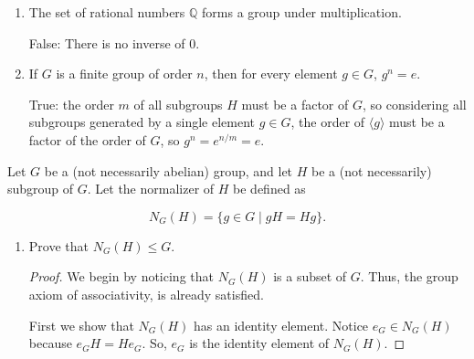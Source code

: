\documentclass{article}
\begin{document}
\begin{enumerate}
{\begin{enumerate}
{                True: we know this to be true because for every \(g' \in G\), 
                \(g * g^{-1} * g' = g'\), so that must be a column of \(g\). 
            }

            \item [7.6] {
                The set of rational numbers \(\mathbb{Q}\) forms a group under 
                multiplication.

                False: There is no inverse of 0.
            }

            \item [7.7] {
                If \(G\) is a finite group of order \(n\), then for every element \(g \in G\),
                \(g^n = e\).

                True: the order \(m\) of all subgroups \(H\) must be a factor of \(G\), 
                so considering all subgroups generated by a single element \(g \in G\), 
                the order of \(\langle g \rangle\) must be a factor of the order of 
                \(G\), so \(g^n = e^{n/m} = e\).
            }
        \end{enumerate}

        \item [Problem 8] {
            Let \(G\) be a (not necessarily abelian) group, and let \(H\) be a 
            (not necessarily) subgroup of \(G\). Let the normalizer of \(H\) be 
            defined as 

            \[N_G(H) = \{ g \in G \mid gH = Hg \} .\]

            \begin{enumerate}
                \item [8.1] {
                    Prove that \(N_G(H) \le G\).

                    \begin{proof}
                        We begin by noticing that \(N_G(H)\) is a subset of 
                        \(G\). Thus, the group axiom of associativity, is 
                        already satisfied. 
                        
                        First we show that \(N_G(H)\) has an identity element.
                        Notice \(e_G \in N_G(H)\) because \(e_G H = H e_G\). So, 
                        \(e_G\) is the identity element of \(N_G(H)\).


\end{proof}}
\end{enumerate}}}
\end{enumerate}
\end{document}
